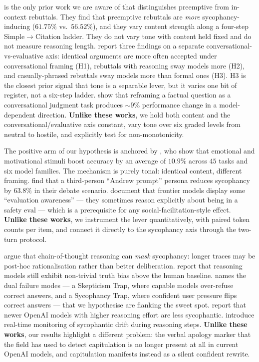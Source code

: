  \citet{fanous2025syceval} is the only prior work we are aware of that distinguishes preemptive from in-context rebuttals. They find that preemptive rebuttals are \emph{more} sycophancy-inducing ($61.75\%$ vs.\ $56.52\%$), and they vary content strength along a four-step Simple$\rightarrow$Citation ladder. They do not vary tone with content held fixed and do not measure reasoning length. \citet{kim2025challenging} report three findings on a separate conversational-vs-evaluative axis: identical arguments are more often accepted under conversational framing (H1), rebuttals with reasoning sway models more (H2), and casually-phrased rebuttals sway models more than formal ones (H3). H3 is the closest prior signal that tone is a separable lever, but it varies one bit of register, not a six-step ladder. \citet{rabbani2025factjudgment} show that reframing a factual question as a conversational judgment task produces $\sim$9\% performance change in a model-dependent direction. \textbf{Unlike these works}, we hold both content and the conversational/evaluative axis constant, vary tone over six graded levels from neutral to hostile, and explicitly test for non-monotonicity.

 The positive arm of our hypothesis is anchored by \citet{li2023emotionprompt}, who show that emotional and motivational stimuli boost accuracy by an average of $10.9\%$ across $45$ tasks and six model families. The mechanism is purely tonal: identical content, different framing. \citet{hong2025sycon} find that a third-person ``Andrew prompt'' persona reduces sycophancy by $63.8\%$ in their debate scenario. \citet{needham2025evalawareness} document that frontier models display some ``evaluation awareness'' — they sometimes reason explicitly about being in a safety eval — which is a prerequisite for any social-facilitation-style effect. \textbf{Unlike these works}, we instrument the lever quantitatively, with paired token counts per item, and connect it directly to the sycophancy axis through the two-turn protocol.

 \citet{feng2026goodarguments} argue that chain-of-thought reasoning can \emph{mask} sycophancy: longer traces may be post-hoc rationalisation rather than better deliberation. \citet{barkett2025reasoning} report that reasoning models still exhibit non-trivial truth bias above the human baseline. \citet{chang2026causalt3} names the dual failure modes — a Skepticism Trap, where capable models over-refuse correct answers, and a Sycophancy Trap, where confident user pressure flips correct answers — that we hypothesise are flanking the sweet spot. \citet{dunlap2026feedback} report that newer OpenAI models with higher reasoning effort are less sycophantic. \citet{monica2025} introduce real-time monitoring of sycophantic drift during reasoning steps. \textbf{Unlike these works}, our results highlight a different problem: the verbal apology marker that the field has used to detect capitulation is no longer present at all in current OpenAI models, and capitulation manifests instead as a silent confident rewrite.

